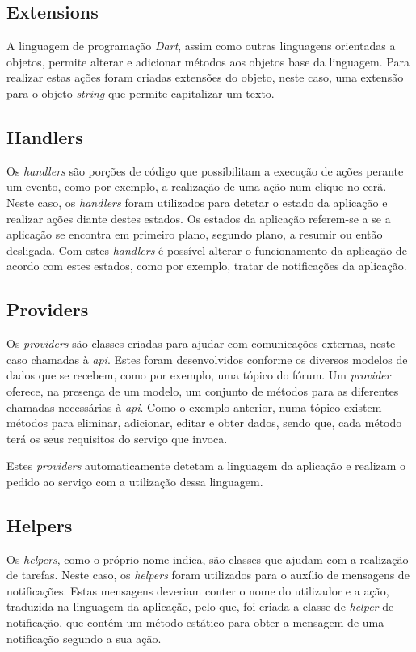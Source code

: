\subsection{Extensions}
A linguagem de programação \textit{Dart}, assim como outras linguagens orientadas a objetos, permite alterar e adicionar métodos aos objetos base da linguagem. Para realizar estas ações foram criadas extensões do objeto, neste caso, uma extensão para o objeto \textit{string} que permite capitalizar um texto.

\subsection{Handlers}
Os \textit{handlers} são porções de código que possibilitam a execução de ações perante um evento, como por exemplo, a realização de uma ação num clique no ecrã. Neste caso, os \textit{handlers} foram utilizados para detetar o estado da aplicação e realizar ações diante destes estados. Os estados da aplicação referem-se a se a aplicação se encontra em primeiro plano, segundo plano, a resumir ou então desligada. Com estes \textit{handlers} é possível alterar o funcionamento da aplicação de acordo com estes estados, como por exemplo, tratar de notificações da aplicação.

\subsection{Providers}
Os \textit{providers} são classes criadas para ajudar com comunicações externas, neste caso chamadas à \textit{\acrshort{api}}. Estes foram desenvolvidos conforme os diversos modelos de dados que se recebem, como por exemplo, uma tópico do fórum. Um \textit{provider} oferece, na presença de um modelo, um conjunto de métodos para as diferentes chamadas necessárias à \textit{\acrshort{api}}. Como o exemplo anterior, numa tópico existem métodos para eliminar, adicionar, editar e obter dados, sendo que, cada método terá os seus requisitos do serviço que invoca.

Estes \textit{providers} automaticamente detetam a linguagem da aplicação e realizam o pedido ao serviço com a utilização dessa linguagem.

\subsection{Helpers}
Os \textit{helpers}, como o próprio nome indica, são classes que ajudam com a realização de tarefas. Neste caso, os \textit{helpers} foram utilizados para o auxílio de mensagens de notificações. Estas mensagens deveriam conter o nome do utilizador e a ação, traduzida na linguagem da aplicação, pelo que, foi criada a classe de \textit{helper} de notificação, que contém um método estático para obter a mensagem de uma notificação segundo a sua ação.
